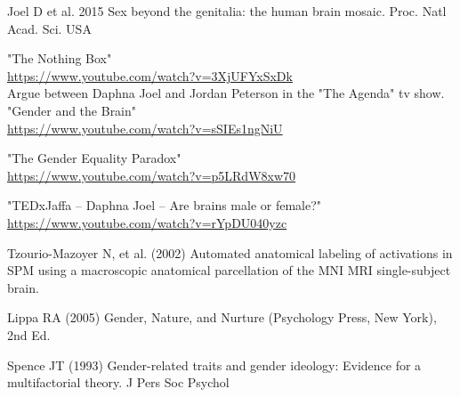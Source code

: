 \documentclass[paper=a4, fontsize=11pt]{scrartcl} %
\numberwithin{equation}{section} %
\numberwithin{figure}{section} %
\numberwithin{table}{section} %
\begin{document}
{\small
\begin{thebibliography}{9999}

 Joel D et al. 2015 Sex beyond the genitalia:
the human brain mosaic. Proc. Natl Acad. Sci. USA 

 "The Nothing Box"\\
\url {https://www.youtube.com/watch?v=3XjUFYxSxDk}\\

 Argue between Daphna Joel and Jordan Peterson in the "The Agenda" tv show.\\ "Gender and the Brain"\\
\url{https://www.youtube.com/watch?v=sSIEs1ngNiU}

 "The Gender Equality Paradox"\\
\url{https://www.youtube.com/watch?v=p5LRdW8xw70}

"TEDxJaffa -- Daphna Joel -- Are brains male or female?"\\
\url{https://www.youtube.com/watch?v=rYpDU040yzc}

 Tzourio-Mazoyer N, et al. (2002) Automated anatomical labeling of activations in
SPM using a macroscopic anatomical parcellation of the MNI MRI single-subject brain.

 Lippa RA (2005) Gender, Nature, and Nurture (Psychology Press, New York), 2nd Ed.

 Spence JT (1993) Gender-related traits and gender ideology: Evidence for a multifactorial
theory. J Pers Soc Psychol



\end{thebibliography}
}



\end{document}
